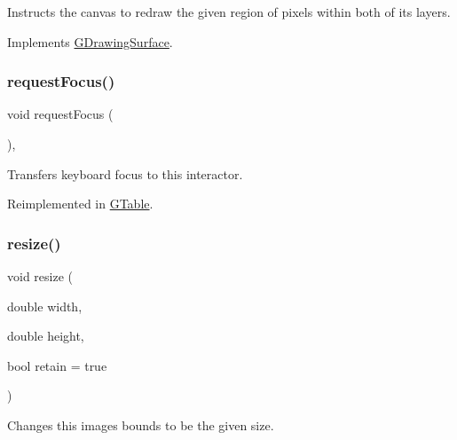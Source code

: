 Instructs the canvas to redraw the given region of pixels within both of its layers. 



Implements \mbox{\hyperlink{classGDrawingSurface_a1a3898317080fecf8af21bbeaeeb37c3}{G\+Drawing\+Surface}}.

\mbox{\label{classGInteractor_a519fb2ac767f8b2febbb50b898b8c8cb}} 
\subsubsection{\texorpdfstring{request\+Focus()}{requestFocus()}}
{\footnotesize\ttfamily void request\+Focus (\begin{DoxyParamCaption}{ }\end{DoxyParamCaption})\hspace{0.3cm}{\ttfamily [virtual]}, {\ttfamily [inherited]}}



Transfers keyboard focus to this interactor. 



Reimplemented in \mbox{\hyperlink{classGTable_a49b39e0eeaf5af829e8956e9055c5cdc}{G\+Table}}.

\mbox{\label{classGCanvas_a090053938117ab698c4c9c1f1cff74a9}} 
\subsubsection{\texorpdfstring{resize()}{resize()}}
{\footnotesize\ttfamily void resize (\begin{DoxyParamCaption}\item[{double}]{width,  }\item[{double}]{height,  }\item[{bool}]{retain = {\ttfamily true} }\end{DoxyParamCaption})\hspace{0.3cm}{\ttfamily [virtual]}}



Changes this image\textquotesingle{}s bounds to be the given size. 

